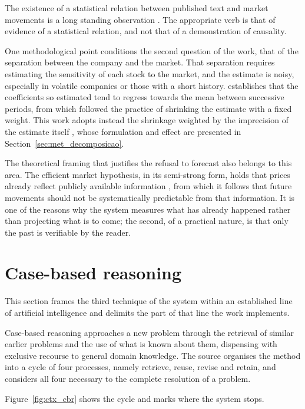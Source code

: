 The existence of a statistical relation between published text and market movements is a long
standing observation \autocite{tetlock2007media}. The appropriate verb is that of evidence of a
statistical relation, and not that of a demonstration of causality.

One methodological point conditions the second question of the work, that of the separation between
the company and the market. That separation requires estimating the sensitivity of each stock to
the market, and the estimate is noisy, especially in volatile companies or those with a short
history. \textcite{blume1971risk} establishes that the coefficients so estimated tend to regress
towards the mean between successive periods, from which followed the practice of shrinking the
estimate with a fixed weight. This work adopts instead the shrinkage weighted by the imprecision
of the estimate itself \autocite{vasicek1973beta}, whose formulation and effect are presented
in Section~\ref{sec:met_decomposicao}.

The theoretical framing that justifies the refusal to forecast also belongs to this area. The
efficient market hypothesis, in its semi-strong form, holds that prices already reflect publicly
available information \autocite{fama1970efficient}, from which it follows that future movements
should not be systematically predictable from that information. It is one of the reasons why the
system measures what has already happened rather than projecting what is to come; the second, of a
practical nature, is that only the past is verifiable by the reader.

\section{Case-based reasoning}
\label{sec:ctx_casos}

This section frames the third technique of the system within an established line of artificial
intelligence and delimits the part of that line the work implements.

Case-based reasoning \autocite{aamodt1994cbr} approaches a new problem through the retrieval of
similar earlier problems and the use of what is known about them, dispensing with exclusive
recourse to general domain knowledge. The source organises the method into a cycle of four
processes, namely retrieve, reuse, revise and retain, and considers all four necessary to the
complete resolution of a problem.

Figure~\ref{fig:ctx_cbr} shows the cycle and marks where the system stops.

